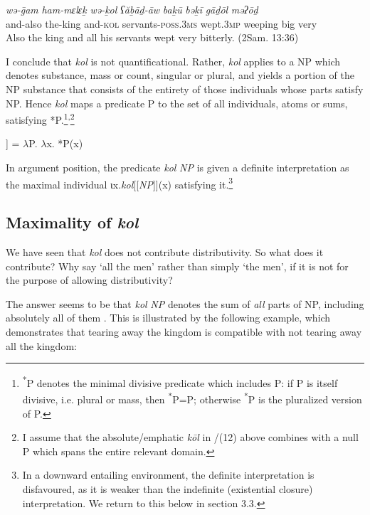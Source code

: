 \documentclass[output=paper]{langsci/langscibook}
\begin{document}
\ea%
    \label{ex:doron:21}
    \gll \textit{wə-ḡam}   \textit{ham-mɛlɛḵ}  \textit{wə-ḵol}     \textit{ʕăḇāḏ-āw}                  \textit{baḵū}          \textit{bəḵī}         \textit{gāḏōl} \textit{məʔōḏ}\\
         and-also  the-king      and-\textsc{kol} servants-\textsc{poss.3ms}  wept.\textsc{3mp}   weeping  big      very\\
    \glt Also the king and all his servants wept very bitterly. (2Sam. 13:36)
\z



I conclude that \textit{kol} is not quantificational. Rather, \textit{kol} applies to a NP which denotes substance, mass or count, singular or plural, and yields a portion of the NP substance that consists of the entirety of those individuals whose parts satisfy NP. Hence \textit{kol} maps a predicate P to the set of all individuals, atoms or sums, satisfying *P.\footnote{\textrm{\textsuperscript{*}}\textrm{P denotes the minimal divisive predicate \citep{Krifka1989} which includes P: if P is itself divisive, i.e. plural or mass, then} \textrm{\textsuperscript{*}}\textrm{P=P; otherwise} \textrm{\textsuperscript{*}}\textrm{P is the pluralized version of P.}}\textsuperscript{,}\footnote{\textrm{I assume that the absolute/emphatic} \textrm{\textit{kōl} }\textrm{in /(12) above combines with a null P which spans the entire relevant domain.}}  

\ea%
    \label{ex:doron:22}\relax
    [[kol]] =  ${\lambda}$P. ${\lambda}$x. *P(x) 
    \z
          
In argument position, the predicate \textit{kol} \textit{NP} is given a definite interpretation as the maximal individual ιx.\textit{kol}[[\textit{NP}]](x) satisfying it.\footnote{\textrm{In a downward entailing environment, the definite interpretation is disfavoured, as it is weaker than the indefinite (existential closure) interpretation. We return to this below in section 3.3.}} 

\subsection{Maximality of \textit{kol}}%

We have seen that \textit{kol} does not contribute distributivity. So what does it contribute? Why say ‘all the men’ rather than simply ‘the men’, if it is not for the purpose of allowing distributivity?

The answer seems to be that \textit{kol} \textit{NP} denotes the sum of \textit{all} parts of NP, including absolutely all of them \citet{Brisson1997,Brisson2003}. This is illustrated by the following example, which demonstrates that tearing away the kingdom is compatible with not tearing away all the kingdom:
\end{document}

